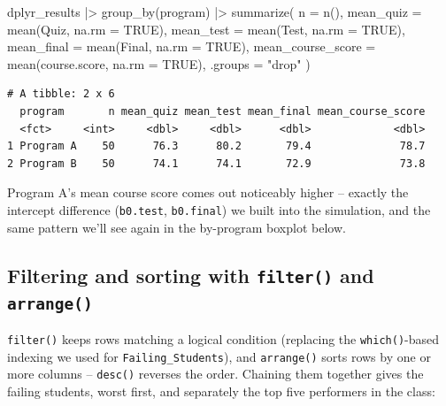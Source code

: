 \documentclass[
  letterpaper,
  DIV=11,
  numbers=noendperiod]{scrreprt}
\newenvironment{Shaded}{\begin{snugshade}}{\end{snugshade}}
\newcommand{\AttributeTok}[1]{\textcolor[rgb]{0.40,0.45,0.13}{#1}}
\newcommand{\ConstantTok}[1]{\textcolor[rgb]{0.56,0.35,0.01}{#1}}
\newcommand{\FunctionTok}[1]{\textcolor[rgb]{0.28,0.35,0.67}{#1}}
\newcommand{\NormalTok}[1]{\textcolor[rgb]{0.00,0.23,0.31}{#1}}
\newcommand{\SpecialCharTok}[1]{\textcolor[rgb]{0.37,0.37,0.37}{#1}}
\newcommand{\StringTok}[1]{\textcolor[rgb]{0.13,0.47,0.30}{#1}}
\begin{document}
\begin{Shaded}
\begin{Highlighting}[]
\NormalTok{dplyr\_results }\SpecialCharTok{|\textgreater{}}
    \FunctionTok{group\_by}\NormalTok{(program) }\SpecialCharTok{|\textgreater{}}
    \FunctionTok{summarize}\NormalTok{(}
        \AttributeTok{n                 =} \FunctionTok{n}\NormalTok{(),}
        \AttributeTok{mean\_quiz         =} \FunctionTok{mean}\NormalTok{(Quiz, }\AttributeTok{na.rm =} \ConstantTok{TRUE}\NormalTok{),}
        \AttributeTok{mean\_test         =} \FunctionTok{mean}\NormalTok{(Test, }\AttributeTok{na.rm =} \ConstantTok{TRUE}\NormalTok{),}
        \AttributeTok{mean\_final        =} \FunctionTok{mean}\NormalTok{(Final, }\AttributeTok{na.rm =} \ConstantTok{TRUE}\NormalTok{),}
        \AttributeTok{mean\_course\_score =} \FunctionTok{mean}\NormalTok{(course.score, }\AttributeTok{na.rm =} \ConstantTok{TRUE}\NormalTok{),}
        \AttributeTok{.groups =} \StringTok{"drop"}
\NormalTok{    )}
\end{Highlighting}
\end{Shaded}

\begin{verbatim}
# A tibble: 2 x 6
  program       n mean_quiz mean_test mean_final mean_course_score
  <fct>     <int>     <dbl>     <dbl>      <dbl>             <dbl>
1 Program A    50      76.3      80.2       79.4              78.7
2 Program B    50      74.1      74.1       72.9              73.8
\end{verbatim}

Program A's mean course score comes out noticeably higher -- exactly the
intercept difference (\texttt{b0.test}, \texttt{b0.final}) we built into
the simulation, and the same pattern we'll see again in the by-program
boxplot below.

\subsection{\texorpdfstring{Filtering and sorting with \texttt{filter()}
and
\texttt{arrange()}}{Filtering and sorting with filter() and arrange()}}\label{filtering-and-sorting-with-filter-and-arrange}

\texttt{filter()} keeps rows matching a logical condition (replacing the
\texttt{which()}-based indexing we used for \texttt{Failing\_Students}),
and \texttt{arrange()} sorts rows by one or more columns --
\texttt{desc()} reverses the order. Chaining them together gives the
failing students, worst first, and separately the top five performers in
the class:
\end{document}
